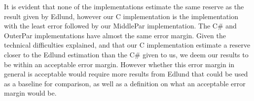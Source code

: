 It is evident that none of the implementations estimate the same reserve as the result given by Edlund, however our C implementation is the implementation with the least error followed by our MiddlePar implementation. The C\# and OuterPar implementations have almost the same error margin. Given the technical difficulties explained, and that our C implementation estimate a reserve closer to the Edlund estimation than the C\# given to us, we deem our results to be within an acceptable error margin. However whether this error margin in general is acceptable would require more results from Edlund that could be used as a baseline for comparison, as well as a definition on what an acceptable error margin would be.